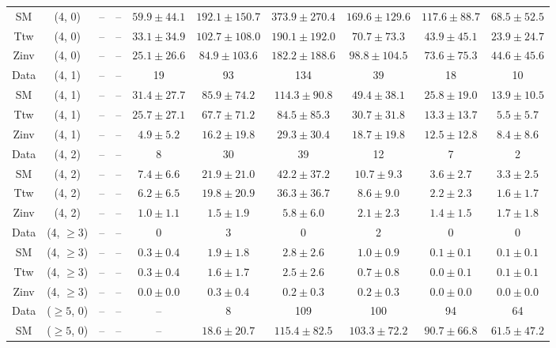 \begin{table}[h!]
{\begin{tabular}{cccccccccc}
	SM & (4, 0) & -- & -- & $59.9\pm 44.1$ & $192.1\pm 150.7$ & $373.9\pm 270.4$ & $169.6\pm 129.6$ & $117.6\pm 88.7$ & $68.5\pm 52.5$ \\[0.5ex] 
	Ttw & (4, 0) & -- & -- & $33.1\pm 34.9$ & $102.7\pm 108.0$ & $190.1\pm 192.0$ & $70.7\pm 73.3$ & $43.9\pm 45.1$ & $23.9\pm 24.7$ \\[0.5ex] 
	Zinv & (4, 0) & -- & -- & $25.1\pm 26.6$ & $84.9\pm 103.6$ & $182.2\pm 188.6$ & $98.8\pm 104.5$ & $73.6\pm 75.3$ & $44.6\pm 45.6$ \\[0.5ex] 
	Data & (4, 1) & -- & -- & 19 & 93 & 134 & 39 & 18 & 10 \\[0.5ex] 
	SM & (4, 1) & -- & -- & $31.4\pm 27.7$ & $85.9\pm 74.2$ & $114.3\pm 90.8$ & $49.4\pm 38.1$ & $25.8\pm 19.0$ & $13.9\pm 10.5$ \\[0.5ex] 
	Ttw & (4, 1) & -- & -- & $25.7\pm 27.1$ & $67.7\pm 71.2$ & $84.5\pm 85.3$ & $30.7\pm 31.8$ & $13.3\pm 13.7$ & $5.5\pm 5.7$ \\[0.5ex] 
	Zinv & (4, 1) & -- & -- & $4.9\pm 5.2$ & $16.2\pm 19.8$ & $29.3\pm 30.4$ & $18.7\pm 19.8$ & $12.5\pm 12.8$ & $8.4\pm 8.6$ \\[0.5ex] 
	Data & (4, 2) & -- & -- & 8 & 30 & 39 & 12 & 7 & 2 \\[0.5ex] 
	SM & (4, 2) & -- & -- & $7.4\pm 6.6$ & $21.9\pm 21.0$ & $42.2\pm 37.2$ & $10.7\pm 9.3$ & $3.6\pm 2.7$ & $3.3\pm 2.5$ \\[0.5ex] 
	Ttw & (4, 2) & -- & -- & $6.2\pm 6.5$ & $19.8\pm 20.9$ & $36.3\pm 36.7$ & $8.6\pm 9.0$ & $2.2\pm 2.3$ & $1.6\pm 1.7$ \\[0.5ex] 
	Zinv & (4, 2) & -- & -- & $1.0\pm 1.1$ & $1.5\pm 1.9$ & $5.8\pm 6.0$ & $2.1\pm 2.3$ & $1.4\pm 1.5$ & $1.7\pm 1.8$ \\[0.5ex] 
	Data & (4, $\ge3$) & -- & -- & 0 & 3 & 0 & 2 & 0 & 0 \\[0.5ex] 
	SM & (4, $\ge3$) & -- & -- & $0.3\pm 0.4$ & $1.9\pm 1.8$ & $2.8\pm 2.6$ & $1.0\pm 0.9$ & $0.1\pm 0.1$ & $0.1\pm 0.1$ \\[0.5ex] 
	Ttw & (4, $\ge3$) & -- & -- & $0.3\pm 0.4$ & $1.6\pm 1.7$ & $2.5\pm 2.6$ & $0.7\pm 0.8$ & $0.0\pm 0.1$ & $0.1\pm 0.1$ \\[0.5ex] 
	Zinv & (4, $\ge3$) & -- & -- & $0.0\pm 0.0$ & $0.3\pm 0.4$ & $0.2\pm 0.3$ & $0.2\pm 0.3$ & $0.0\pm 0.0$ & $0.0\pm 0.0$ \\[0.5ex] 
	Data & ($\ge5$, 0) & -- & -- & -- & 8 & 109 & 100 & 94 & 64 \\[0.5ex] 
	SM & ($\ge5$, 0) & -- & -- & -- & $18.6\pm 20.7$ & $115.4\pm 82.5$ & $103.3\pm 72.2$ & $90.7\pm 66.8$ & $61.5\pm 47.2$ \\[0.5ex] 

\end{tabular}}
\end{table}
